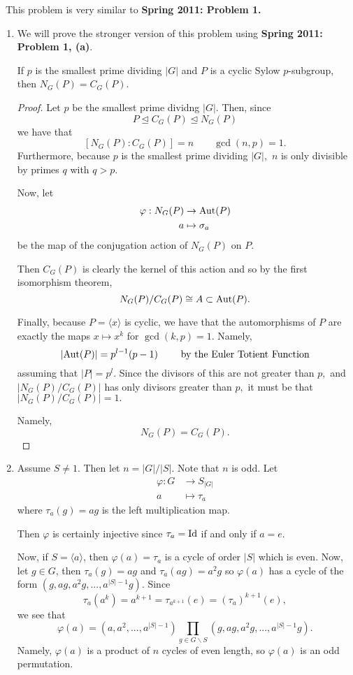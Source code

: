 \documentclass[12pt]{Qual}
\begin{document}
\begin{solution}$\,$
This problem is very similar to \textbf{Spring 2011: Problem 1.}
\begin{enumerate}[label=(\alph*)]
    \item We will prove the stronger version of this problem using \textbf{Spring 2011: Problem 1, (a)}.

    \begin{claim} If $p$ is the smallest prime dividing $|G|$ and $P$ is a cyclic Sylow $p$-subgroup, then $N_G(P)=C_G(P).$
    \begin{proof} Let $p$ be the smallest prime dividng $|G|.$ Then, since $$P\trianglelefteq C_G(P)\trianglelefteq N_G(P)$$ we have that $$[N_G(P):C_G(P)]=n\qquad \gcd(n,p)=1.$$ Furthermore, because $p$ is the smallest prime dividing $|G|,$ $n$ is only divisible by primes $q$ with $q>p.$

    Now, let \begin{align*}
        \varphi:N_G(P)&\to\text{Aut}(P)\\
        a&\mapsto\sigma_a
    \end{align*} be the map of the conjugation action of $N_G(P)$ on $P.$

    Then $C_G(P)$ is clearly the kernel of this action and so by the first isomorphism theorem, $$N_G(P)/C_G(P)\cong A\subset\text{Aut}(P).$$

    Finally, because $P=\langle x\rangle$ is cyclic, we have that the automorphisms of $P$ are exactly the maps $x\mapsto x^k$ for $\gcd(k,p)=1$. Namely, $$|\text{Aut}(P)|=p^{l-1}(p-1)\qquad\text{ by the Euler Totient Function}$$ assuming that $|P|=p^l$. Since the divisors of this are not greater than $p,$ and $|N_G(P)/C_G(P)|$ has only divisors greater than $p,$ it must be that $|N_G(P)/C_G(P)|=1.$

    Namely, $$N_G(P)=C_G(P).$$
    \end{proof}
    \end{claim}

    \item Assume $S\not=1$. Then let $n=|G|/|S|$. Note that $n$ is odd. Let \begin{align*}
        \varphi:G&\to S_{|G|}\\
        a&\mapsto \tau_a
    \end{align*} where $\tau_a(g)=ag$ is the left multiplication map.

    Then $\varphi$ is certainly injective since $\tau_a=\text{Id}$ if and only if $a=e$.

    Now, if $S=\langle a\rangle$, then $\varphi(a)=\tau_a$ is a cycle of order $|S|$ which is even. Now, let $g\in G$, then $\tau_a(g)=ag$ and $\tau_a(ag)=a^2g$ so $\varphi(a)$ has a cycle of the form $(g,ag,a^2g,...,a^{|S|-1}g)$. Since $$\tau_a(a^k)=a^{k+1}=\tau_{a^{k+1}}(e)=(\tau_a)^{k+1}(e),$$ we see that $$\varphi(a)=(a,a^2,...,a^{|S|-1})\prod_{g\in G\backslash S}(g,ag,a^2g,...,a^{|S|-1}g).$$ Namely, $\varphi(a)$ is a product of $n$ cycles of even length, so $\varphi(a)$ is an odd permutation.


\end{enumerate}
\end{solution}
\end{document}
